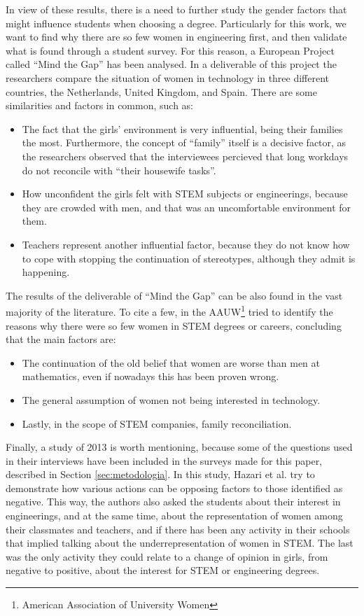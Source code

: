 \documentclass[journal,transmag]{IEEEtran}
\begin{document}
In view of these results, there is a need to further study the gender factors that might influence students when choosing a degree. Particularly for this work, we want to find why there are so few women in engineering first, and then validate what is found through a student survey. For this reason, a European Project called ``Mind the Gap'' has been analysed. In a deliverable of this project \cite{mtg2015} the researchers compare the situation of women in technology in three different countries, the Netherlands, United Kingdom, and Spain.
There are some similarities and factors in common, such as: 
\begin{itemize}
	\item The fact that the girls' environment is very influential, being their families the most. Furthermore, the concept of ``family'' itself is a decisive factor, as the researchers observed that the interviewees percieved that long workdays do not reconcile with ``their housewife tasks''.
	\item How unconfident the girls felt with STEM subjects or engineerings, because they are crowded with men, and that was an uncomfortable environment for them.
	\item Teachers represent another influential factor, because they do not know how to cope with stopping the continuation of stereotypes, although they admit is happening.
\end{itemize}

The results of the deliverable of ``Mind the Gap'' can be also found in the vast majority of the literature. To cite a few, in \cite{hill2010so} the AAUW\footnote{American Association of University Women} tried to identify the reasons why there were so few women in STEM degrees or careers, concluding that the main factors are:

\begin{itemize}
	\item The continuation of the old belief that women are worse than men at mathematics, even if nowadays this has been proven wrong.
	\item The general assumption of women not being interested in technology.
	\item Lastly, in the scope of STEM companies, family reconciliation.
\end{itemize}

Finally, a study of 2013 \cite{hazari2013factors} is worth mentioning, because some of the questions used in their interviews have been included in the surveys made for this paper, described in Section \ref{sec:metodologia}. In this study, Hazari et al. try to demonstrate how various actions can be opposing factors to those identified as negative. This way, the authors also asked the students about their interest in engineerings, and at the same time, about the representation of women among their classmates and teachers, and if there has been any activity in their schools that implied talking about the underrepresentation of women in STEM. The last was the only activity they could relate to a change of opinion in girls, from negative to positive, about the interest for STEM or engineering degrees.
\end{document}

